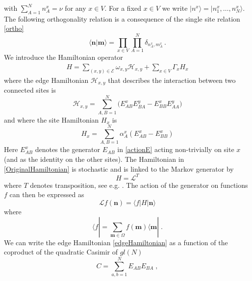 \documentclass[10pt]{article}
\numberwithin{equation}{section}
\numberwithin{equation}{subsection}
\newcommand{\co}{\;,}
\newcommand{\dt}{\;.}
\begin{document}
with $\sum_{A=1}^{N}n_{A}^{x}=\nu$ for any $x\in V$. For a fixed $x\in V$ we write $|n^{x}\rangle=|n_{1}^{x},\ldots,n_{N}^{x}\rangle$. The following orthogonality relation is a consequence of the single site relation \eqref{ortho}
\begin{equation}
    \langle {\bm{n}}|{\bm{m}}\rangle =\prod_{x\in V}\prod_{A=1}^N\delta_{n^x_{A},m^{x}_{A}}\,.
\end{equation}
We introduce the Hamiltonian operator
\begin{equation}\label{OriginalHamiltonian}
	\begin{split}
		H=\sum_{(x,y)\in \mathcal{E}}\omega_{x,y}\mathcal{H}_{x,y}+\sum_{x\in V}\Gamma_{x}H_{x}
	\end{split}
\end{equation}
where the edge Hamiltonian $\mathcal{H}_{x,y}$ that describes the interaction between two connected sites is
\begin{equation}\label{edgeHamiltonian}
\mathcal{H}_{x,y}=\sum_{A,B=1}^{N}\Big(E_{AB}^{x} E_{BA}^{y}-E_{BB}^{x} E_{AA}^{y}\Big)
 \end{equation}
  and where the site Hamiltonian $H_{x}$  is
 \begin{equation}\label{siteHamiltonian}
H_{x}=\sum_{A,B=1}^{N}\alpha_{A}^{x}\left(E_{AB}^{x}-E_{BB}^{x}\right)
\end{equation}
Here $E_{AB}^{x}$ denotes the generator $E_{AB}$ in \eqref{actionE} acting non-trivially on site $x$ (and as the identity on the other sites). 
The Hamiltonian in \eqref{OriginalHamiltonian} is stochastic and is linked to the Markov generator  by
\begin{equation}\label{Hamiltonian-Generator}
H=\mathcal{L}^{T} 
\end{equation}
where $T$ denotes transposition, see e.g.  \cite{belitsky2015self}.
The action of the generator on functions $f$ can then  be expressed as 
\begin{equation}
    \mathcal{L}f( {\bm{n}})=\langle f|H| {\bm{n}}\rangle
\end{equation}
where 
\begin{equation}
    \langle f|=\sum_{ {{\bm{m}}\in \Omega}}f( {\bm{m}})\langle  {\bm{m}}|\dt
\end{equation}
We can write the edge Hamiltonian \eqref{edgeHamiltonian} as a function of the coproduct of the quadratic Casimir of ${gl}(N)$
\begin{equation}\label{secondCasimir}
    C=\sum_{a,b=1}^{N}E_{AB}E_{BA}\co
\end{equation}
\end{document}
